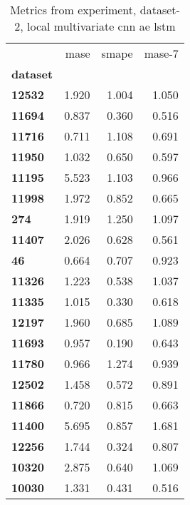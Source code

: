 \begin{table}[h]
\centering
\caption{Metrics from experiment, dataset-2, local multivariate cnn ae lstm}
\label{table:local-multivariate-cnn-ae-lstm-dataset-2}
\begin{tabular}{lrrr}
\toprule
{} &   mase &  smape &  mase-7 \\
\textbf{dataset} &        &        &         \\
\midrule
\textbf{12532  } &  1.920 &  1.004 &   1.050 \\
\textbf{11694  } &  0.837 &  0.360 &   0.516 \\
\textbf{11716  } &  0.711 &  1.108 &   0.691 \\
\textbf{11950  } &  1.032 &  0.650 &   0.597 \\
\textbf{11195  } &  5.523 &  1.103 &   0.966 \\
\textbf{11998  } &  1.972 &  0.852 &   0.665 \\
\textbf{274    } &  1.919 &  1.250 &   1.097 \\
\textbf{11407  } &  2.026 &  0.628 &   0.561 \\
\textbf{46     } &  0.664 &  0.707 &   0.923 \\
\textbf{11326  } &  1.223 &  0.538 &   1.037 \\
\textbf{11335  } &  1.015 &  0.330 &   0.618 \\
\textbf{12197  } &  1.960 &  0.685 &   1.089 \\
\textbf{11693  } &  0.957 &  0.190 &   0.643 \\
\textbf{11780  } &  0.966 &  1.274 &   0.939 \\
\textbf{12502  } &  1.458 &  0.572 &   0.891 \\
\textbf{11866  } &  0.720 &  0.815 &   0.663 \\
\textbf{11400  } &  5.695 &  0.857 &   1.681 \\
\textbf{12256  } &  1.744 &  0.324 &   0.807 \\
\textbf{10320  } &  2.875 &  0.640 &   1.069 \\
\textbf{10030  } &  1.331 &  0.431 &   0.516 \\
\bottomrule
\end{tabular}
\end{table}
